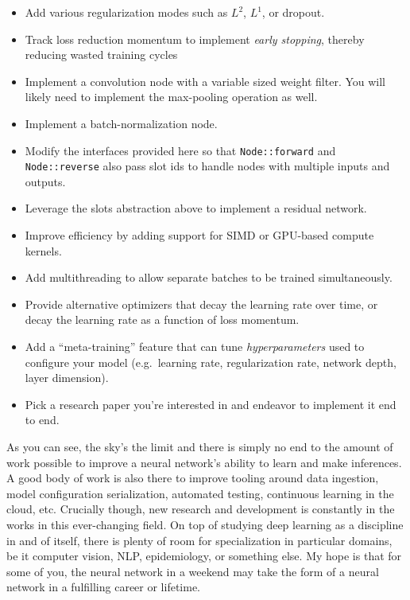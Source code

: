 \documentclass[
]{article}
\providecommand{\tightlist}{%
  \setlength{\itemsep}{0pt}\setlength{\parskip}{0pt}}
\begin{document}
\begin{itemize}
\tightlist
\item
  Add various regularization modes such as \(L^2\), \(L^1\), or dropout.
\item
  Track loss reduction momentum to implement \emph{early stopping},
  thereby reducing wasted training cycles
\item
  Implement a convolution node with a variable sized weight filter. You
  will likely need to implement the max-pooling operation as well.
\item
  Implement a batch-normalization node.
\item
  Modify the interfaces provided here so that \texttt{Node::forward} and
  \texttt{Node::reverse} also pass slot ids to handle nodes with
  multiple inputs and outputs.
\item
  Leverage the slots abstraction above to implement a residual network.
\item
  Improve efficiency by adding support for SIMD or GPU-based compute
  kernels.
\item
  Add multithreading to allow separate batches to be trained
  simultaneously.
\item
  Provide alternative optimizers that decay the learning rate over time,
  or decay the learning rate as a function of loss momentum.
\item
  Add a ``meta-training'' feature that can tune \emph{hyperparameters}
  used to configure your model (e.g.~learning rate, regularization rate,
  network depth, layer dimension).
\item
  Pick a research paper you're interested in and endeavor to implement
  it end to end.
\end{itemize}

As you can see, the sky's the limit and there is simply no end to the
amount of work possible to improve a neural network's ability to learn
and make inferences. A good body of work is also there to improve
tooling around data ingestion, model configuration serialization,
automated testing, continuous learning in the cloud, etc. Crucially
though, new research and development is constantly in the works in this
ever-changing field. On top of studying deep learning as a discipline in
and of itself, there is plenty of room for specialization in particular
domains, be it computer vision, NLP, epidemiology, or something else. My
hope is that for some of you, the neural network in a weekend may take
the form of a neural network in a fulfilling career or lifetime.
\end{document}

